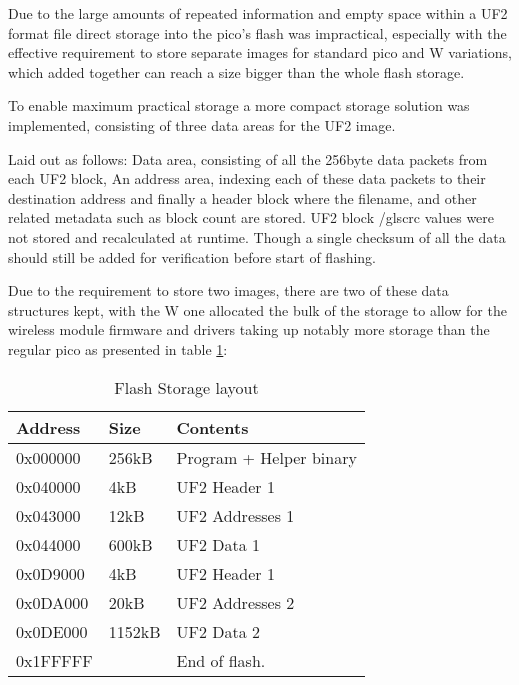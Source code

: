 Due to the large amounts of repeated information and empty space within a UF2 format file direct storage into the pico's flash was impractical, especially with the effective requirement to store separate images for standard pico and W variations, which added together can reach a size bigger than the whole flash storage.

To enable maximum practical storage a more compact storage solution was implemented, consisting of three data areas for the UF2 image.

Laid out as follows: Data area, consisting of all the 256byte data packets from each UF2 block, An address area, indexing each of these data packets to their destination address and finally a header block where the filename, and other related metadata such as block count are stored. UF2 block /gls{crc} values were not stored and recalculated at runtime. Though a single checksum of all the data should still be added for verification before start of flashing.

Due to the requirement to store two images, there are two of these data structures kept, with the W one allocated the bulk of the storage to allow for the wireless module firmware and drivers taking up notably more storage than the regular pico as presented in table \ref{table:file_storage}:

\begin{table}[h]
	\centering
	\caption{Flash Storage layout}%
	\vspace{-16.5pt}%

		\begin{tabular}{|l|l|l|}
			\hline
			Address & Size  & Contents        \\ \hline
			0x000000 & 256kB & Program + Helper binary \\ \hline
			0x040000 & 4kB & UF2 Header 1      \\ \hline
			0x043000 & 12kB & UF2 Addresses 1 \\ \hline
			0x044000 & 600kB & UF2 Data 1 \\ \hline
			0x0D9000 & 4kB & UF2 Header 1 \\ \hline
			0x0DA000 & 20kB & UF2 Addresses 2      \\ \hline
			0x0DE000 & 1152kB & UF2 Data 2 \\ \hline
			0x1FFFFF & & End of flash. \\ \hline
		\end{tabular}
		\label{table:file_storage}
\end{table}

